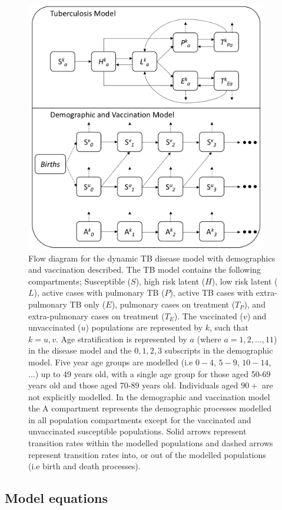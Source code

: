 \documentclass[11pt,twoside]{bristolthesis}
\begin{document}
  \begin{figure}
  
  {\centering \includegraphics[width=400px,]{chapters/model-development/resources/model_diagrams/tb_model_flow} 
  
  }
  
  \caption[Flow diagram for the dynamic TB disease model with demographics and vaccination described.]{Flow diagram for the dynamic TB disease model with demographics and vaccination described. The TB model contains the following compartments; Susceptible ($S$), high risk latent ($H$), low risk latent ($L$), active cases with pulmonary TB ($P$), active TB cases with extra-pulmonary TB only ($E$), pulmonary cases on treatment ($T_P$), and extra-pulmonary cases on treatment ($T_E$). The vaccinated ($v$) and unvaccinated ($u$) populations are represented by $k$, such that $k = u,v$. Age stratification is represented by $a$ (where $a = 1, 2, ...,11$) in the disease model and the $0, 1, 2, 3$ subscripts in the demographic model. Five year age groups are modelled (i.e $0-4$, $5-9$, $10-14$, ...) up to 49 years old, with a single age group for those aged 50-69 years old and those aged 70-89 years old. Individuals aged $90+$ are not explicitly modelled. In the demographic and vaccination model the A compartment represents the demographic processes modelled in all population compartments except for the vaccinated and unvaccinated susceptible populations. Solid arrows represent transition rates within the modelled populations and dashed arrows represent transition rates into, or out of the modelled populations (i.e birth and death processes).}\label{fig:model-flow-diag}
  \end{figure}
  \hypertarget{model-equations}{%
  \subsection{Model equations}\label{model-equations}}
  
\end{document}
